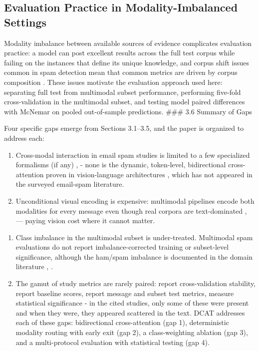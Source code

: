 \documentclass[10pt,twoside]{article}
\begin{document}
\subsection{Evaluation Practice in Modality-Imbalanced Settings}\label{sec:3.5}

Modality imbalance between available sources of evidence complicates evaluation practice: a model can post excellent results across the full test corpus while failing on the instances that define its unique knowledge, and corpus shift issues common in spam detection mean that common metrics are driven by corpus composition \citep{janez2023review}. These issues motivate the evaluation approach used here: separating full test from multimodal subset performance, performing five-fold cross-validation in the multimodal subset, and testing model paired differences with McNemar \citep{mcnemar1947note} on pooled out-of-sample predictions. \#\#\# 3.6 Summary of Gaps

Four specific gaps emerge from Sections 3.1--3.5, and the paper is organized to address each:

\begin{enumerate}[leftmargin=*,itemsep=1.5pt]
\item[1.] Cross-modal interaction in email spam studies is limited to a few specialized formalisms (if any) \citep{zhang2023mmtd}, \citep{arevalo2017gmu} - none is the dynamic, token-level, bidirectional cross-attention proven in vision-language architectures \citep{lu2019vilbert}, which has not appeared in the surveyed email-spam literature.
\item[2.] Unconditional visual encoding is expensive: multimodal pipelines encode both modalities for every message \citep{zhang2023mmtd} even though real corpora are text-dominated \citep{janez2023review}, \citep{spamassassin2006} --- paying vision cost where it cannot matter.
\end{enumerate}

\begin{enumerate}[leftmargin=*,itemsep=1.5pt]
\item[3.] Class imbalance in the multimodal subset is under-treated. Multimodal spam evaluations do not report imbalance-corrected training or subset-level significance, although the ham/spam imbalance is documented in the domain literature \citep{janez2023review}, \citep{annadatha2018image}.
\item[4.] The gamut of study metrics are rarely paired: report cross-validation stability, report baseline scores, report message and subset test metrics, measure statistical significance - in the cited studies, only some of these were present and when they were, they appeared scattered in the text. DCAT addresses each of these gaps: bidirectional cross-attention (gap 1), deterministic modality routing with early exit (gap 2), a class-weighting ablation (gap 3), and a multi-protocol evaluation with statistical testing (gap 4).
\end{enumerate}
\end{document}
